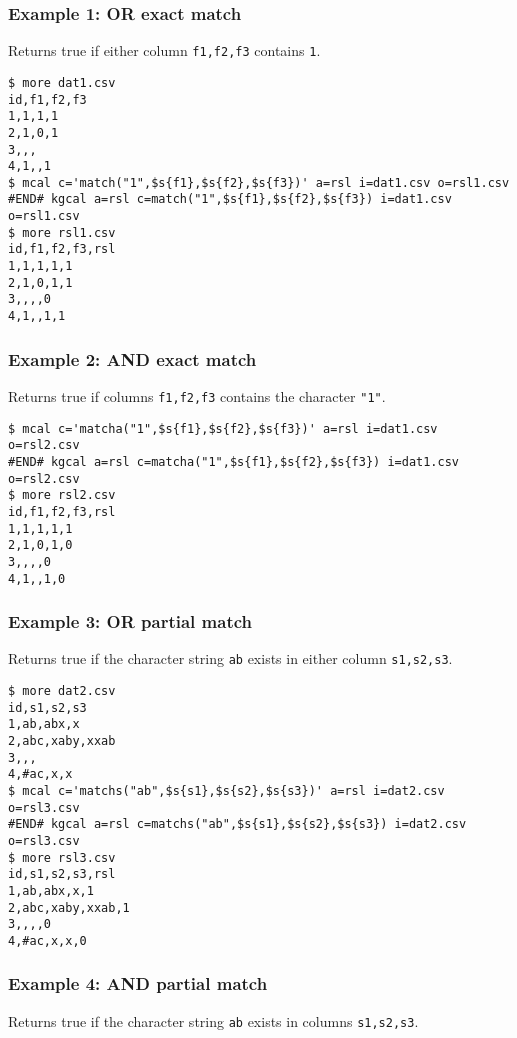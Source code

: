 \subsubsection*{Example 1: OR exact match}

Returns true if either column \verb|f1,f2,f3| contains \verb|1|.


\begin{Verbatim}[baselinestretch=0.7,frame=single]
$ more dat1.csv
id,f1,f2,f3
1,1,1,1
2,1,0,1
3,,,
4,1,,1
$ mcal c='match("1",$s{f1},$s{f2},$s{f3})' a=rsl i=dat1.csv o=rsl1.csv
#END# kgcal a=rsl c=match("1",$s{f1},$s{f2},$s{f3}) i=dat1.csv o=rsl1.csv
$ more rsl1.csv
id,f1,f2,f3,rsl
1,1,1,1,1
2,1,0,1,1
3,,,,0
4,1,,1,1
\end{Verbatim}
\subsubsection*{Example 2: AND exact match}

Returns true if columns \verb|f1,f2,f3| contains the character \verb|"1"|.


\begin{Verbatim}[baselinestretch=0.7,frame=single]
$ mcal c='matcha("1",$s{f1},$s{f2},$s{f3})' a=rsl i=dat1.csv o=rsl2.csv
#END# kgcal a=rsl c=matcha("1",$s{f1},$s{f2},$s{f3}) i=dat1.csv o=rsl2.csv
$ more rsl2.csv
id,f1,f2,f3,rsl
1,1,1,1,1
2,1,0,1,0
3,,,,0
4,1,,1,0
\end{Verbatim}
\subsubsection*{Example 3: OR partial match}

Returns true if the character string \verb|ab| exists in either column \verb|s1,s2,s3|.


\begin{Verbatim}[baselinestretch=0.7,frame=single]
$ more dat2.csv
id,s1,s2,s3
1,ab,abx,x
2,abc,xaby,xxab
3,,,
4,#ac,x,x
$ mcal c='matchs("ab",$s{s1},$s{s2},$s{s3})' a=rsl i=dat2.csv o=rsl3.csv
#END# kgcal a=rsl c=matchs("ab",$s{s1},$s{s2},$s{s3}) i=dat2.csv o=rsl3.csv
$ more rsl3.csv
id,s1,s2,s3,rsl
1,ab,abx,x,1
2,abc,xaby,xxab,1
3,,,,0
4,#ac,x,x,0
\end{Verbatim}
\subsubsection*{Example 4: AND partial match}

Returns true if the character string \verb|ab| exists in columns \verb|s1,s2,s3|.


